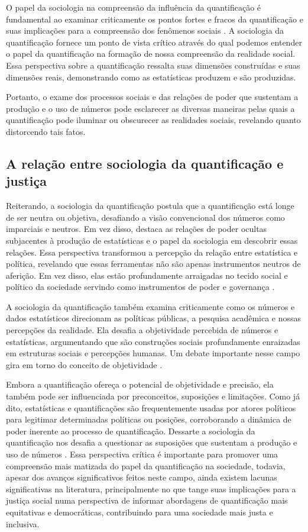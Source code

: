 O papel da sociologia na compreensão da influência da quantificação é fundamental ao examinar criticamente os pontos fortes e fracos da quantificação e suas implicações para a compreensão dos fenômenos sociais \cite{camargo2021quantificaccao}. A sociologia da quantificação fornece um ponto de vista crítico através do qual podemos entender o papel da quantificação na formação de nossa compreensão da realidade social. Essa perspectiva sobre a quantificação ressalta suas dimensões construídas e suas dimensões reais, demonstrando como as estatísticas produzem e são produzidas.

Portanto, o exame dos processos sociais e das relações de poder que sustentam a produção e o uso de números pode esclarecer as diversas maneiras pelas quais a quantificação pode iluminar ou obscurecer as realidades sociais, revelando quanto distorcendo tais fatos.

\subsection{A relação entre sociologia da quantificação e justiça}

Reiterando, a sociologia da quantificação postula que a quantificação está longe de ser neutra ou objetiva, desafiando a visão convencional dos números como imparciais e neutros. Em vez disso, destaca as relações de poder ocultas subjacentes à produção de estatísticas e o papel da sociologia em descobrir essas relações. Essa perspectiva transformou a percepção da relação entre estatística e política, revelando que essas ferramentas não são apenas instrumentos neutros de aferição. Em vez disso, elas estão profundamente arraigadas no tecido social e político da sociedade servindo como instrumentos de poder e governança \cite{turnbull2022slow}.

A sociologia da quantificação também examina criticamente como os números e dados estatísticos direcionam as políticas públicas, a pesquisa acadêmica e nossas percepções da realidade. Ela desafia a objetividade percebida de números e estatísticas, argumentando que são construções sociais profundamente enraizadas em estruturas sociais e percepções humanas. Um debate importante nesse campo gira em torno do conceito de objetividade \cite{salais2012quantificação}. 

Embora a quantificação ofereça o potencial de objetividade e precisão, ela também pode ser influenciada por preconceitos, suposições e limitações. Como já dito, estatísticas e quantificações são frequentemente usadas por atores políticos para legitimar determinadas políticas ou posições, corroborando a dinâmica de poder inerente ao processo de quantificação. Dessarte a sociologia da quantificação nos desafia a questionar as suposições que sustentam a produção e uso de números \cite{turnbull2022slow}. Essa perspectiva crítica é importante para promover uma compreensão mais matizada do papel da quantificação na sociedade, todavia, apesar dos avanços significativos feitos neste campo, ainda existem lacunas significativas na literatura, principalmente no que tange suas implicações para a justiça social numa perspectiva de informar abordagens de quantificação mais equitativas e democráticas, contribuindo para uma sociedade mais justa e inclusiva.

